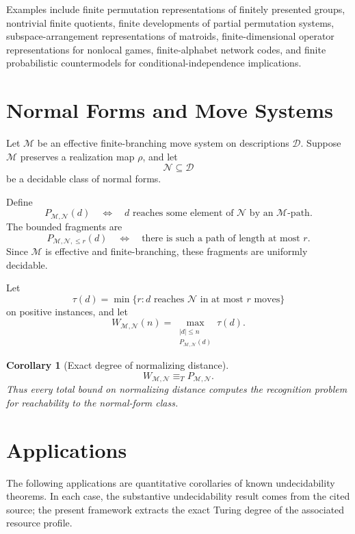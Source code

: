\documentclass[11pt]{article}
\newtheorem{corollary}[theorem]{Corollary}
\begin{document}
Examples include finite permutation representations of finitely presented groups, nontrivial finite quotients, finite developments of partial permutation systems, subspace-arrangement representations of matroids, finite-dimensional operator representations for nonlocal games, finite-alphabet network codes, and finite probabilistic countermodels for conditional-independence implications.

\section{Normal Forms and Move Systems}

Let \(\mathcal M\) be an effective finite-branching move system on descriptions \(\mathcal D\). Suppose \(\mathcal M\) preserves a realization map \(\rho\), and let
\[
\mathcal N\subseteq\mathcal D
\]
be a decidable class of normal forms.

Define
\[
P_{\mathcal M,\mathcal N}(d)
\quad\Longleftrightarrow\quad
\text{\(d\) reaches some element of \(\mathcal N\) by an \(\mathcal M\)-path}.
\]
The bounded fragments are
\[
P_{\mathcal M,\mathcal N,\le r}(d)
\quad\Longleftrightarrow\quad
\text{there is such a path of length at most \(r\)}.
\]
Since \(\mathcal M\) is effective and finite-branching, these fragments are uniformly decidable.

Let
\[
\tau(d)=\min\{r:d\text{ reaches }\mathcal N\text{ in at most }r\text{ moves}\}
\]
on positive instances, and let
\[
W_{\mathcal M,\mathcal N}(n)
=
\max_{\substack{|d|\le n\\ P_{\mathcal M,\mathcal N}(d)}}
\tau(d).
\]

\begin{corollary}[Exact degree of normalizing distance]
\[
W_{\mathcal M,\mathcal N}\equiv_T P_{\mathcal M,\mathcal N}.
\]
Thus every total bound on normalizing distance computes the recognition problem for reachability to the normal-form class.
\end{corollary}

\section{Applications}

The following applications are quantitative corollaries of known undecidability theorems. In each case, the substantive undecidability result comes from the cited source; the present framework extracts the exact Turing degree of the associated resource profile.
\end{document}
